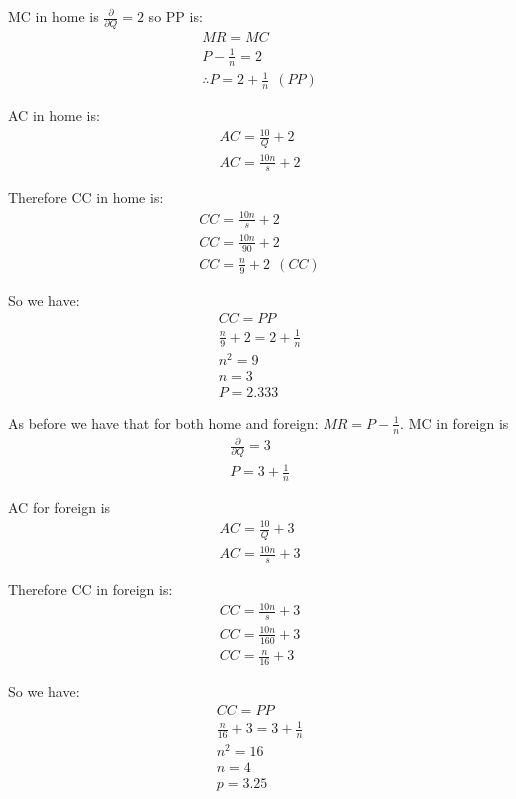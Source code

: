 \documentclass{article}
\begin{document}
MC in home is $\frac{\partial}{ \partial Q} = 2$ so PP is:
\begin{gather*}
  MR = MC \\
  P - \frac{1}{n} = 2 \\
  \therefore P = 2 + \frac{1}{n} \ \ (PP)
\end{gather*}

AC in home is:
\begin{gather*}
  AC = \frac{10}{Q} + 2 \\
  AC = \frac{10n}{s} + 2
\end{gather*}

Therefore CC in home is:
\begin{gather*}
  CC = \frac{10n}{s} + 2 \\
  CC = \frac{10n}{90} + 2 \\
  CC = \frac{n}{9} + 2 \ \ (CC)
\end{gather*}


So we have:
\begin{gather*}
  CC = PP \\
  \frac{n}{9} + 2 = 2 + \frac{1}{n} \\
  n^{2} = 9 \\
  n = 3 \\
  P = 2.333
\end{gather*}

As before we have that for both home and foreign: $MR = P - \frac{1}{n}$. MC in foreign is
\begin{gather*}
  \frac{\partial}{\partial Q} = 3 \\
  P = 3 + \frac{1}{n}
\end{gather*}

AC for foreign is
\begin{gather*}
  AC = \frac{10}{Q} + 3 \\
  AC = \frac{10n}{s} + 3
\end{gather*}

Therefore CC in foreign is:
\begin{gather*}
  CC = \frac{10n}{s} + 3 \\
  CC = \frac{10n}{160} + 3 \\
  CC = \frac{n}{16} + 3
\end{gather*}

So we have:
\begin{gather*}
  CC = PP \\
  \frac{n}{16} + 3 = 3 + \frac{1}{n} \\
  n^{2} = 16 \\
  n = 4 \\
  p = 3.25
\end{gather*}
\end{document}
